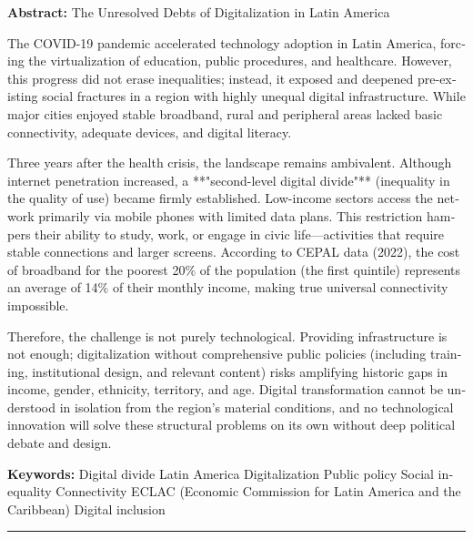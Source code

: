 \begin{tcolorbox}[colback=brown!8!white,colframe=brown!8!white,boxrule=0pt,arc=2pt,left=4pt,right=4pt,top=3pt,bottom=3pt,before skip=4pt,after skip=4pt]
\begin{otherlanguage}{english}
\sffamily\small \textbf{Abstract:} The Unresolved Debts of Digitalization in Latin America

The COVID-19 pandemic accelerated technology adoption in Latin America, forcing the virtualization of education, public procedures, and healthcare. However, this progress did not erase inequalities; instead, it exposed and deepened pre-existing social fractures in a region with highly unequal digital infrastructure. While major cities enjoyed stable broadband, rural and peripheral areas lacked basic connectivity, adequate devices, and digital literacy.

Three years after the health crisis, the landscape remains ambivalent. Although internet penetration increased, a **"second-level digital divide"** (inequality in the quality of use) became firmly established. Low-income sectors access the network primarily via mobile phones with limited data plans. This restriction hampers their ability to study, work, or engage in civic life—activities that require stable connections and larger screens. According to CEPAL data (2022), the cost of broadband for the poorest 20\% of the population (the first quintile) represents an average of 14\% of their monthly income, making true universal connectivity impossible.

Therefore, the challenge is not purely technological. Providing infrastructure is not enough; digitalization without comprehensive public policies (including training, institutional design, and relevant content) risks amplifying historic gaps in income, gender, ethnicity, territory, and age. Digital transformation cannot be understood in isolation from the region's material conditions, and no technological innovation will solve these structural problems on its own without deep political debate and design.
\par\smallskip\noindent\textbf{Keywords:} Digital divide Latin America Digitalization Public policy Social inequality Connectivity ECLAC (Economic Commission for Latin America and the Caribbean) Digital inclusion
\end{otherlanguage}
\end{tcolorbox}

\bigskip
\noindent\rule{\linewidth}{0.4pt}
\bigskip

